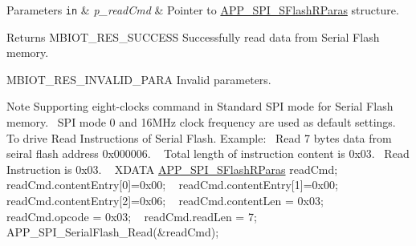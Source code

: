 \begin{DoxyParams}[1]{Parameters}
\mbox{\tt in}  & {\em p\+\_\+read\+Cmd} & Pointer to \hyperlink{struct_a_p_p___s_p_i___s_flash_r_paras}{A\+P\+P\+\_\+\+S\+P\+I\+\_\+\+S\+Flash\+R\+Paras} structure.\\
\hline
\end{DoxyParams}
\begin{DoxyReturn}{Returns}
M\+B\+I\+O\+T\+\_\+\+R\+E\+S\+\_\+\+S\+U\+C\+C\+E\+SS Successfully read data from Serial Flash memory. 

M\+B\+I\+O\+T\+\_\+\+R\+E\+S\+\_\+\+I\+N\+V\+A\+L\+I\+D\+\_\+\+P\+A\+RA Invalid parameters.
\end{DoxyReturn}
\begin{DoxyNote}{Note}
Supporting eight-\/clocks command in Standard S\+PI mode for Serial Flash memory.~\newline
 S\+PI mode 0 and 16\+M\+Hz clock frequency are used as default settings. ~\newline
 To drive Read Instructions of Serial Flash. Example\+:~\newline
 Read 7 bytes data from seiral flash address 0x000006. ~\newline
 Total length of instruction content is 0x03.~\newline
 Read Instruction is 0x03. ~\newline
 X\+D\+A\+TA \hyperlink{struct_a_p_p___s_p_i___s_flash_r_paras}{A\+P\+P\+\_\+\+S\+P\+I\+\_\+\+S\+Flash\+R\+Paras} read\+Cmd; ~\newline
 read\+Cmd.\+content\+Entry\mbox{[}0\mbox{]}=0x00; ~\newline
 read\+Cmd.\+content\+Entry\mbox{[}1\mbox{]}=0x00; ~\newline
 read\+Cmd.\+content\+Entry\mbox{[}2\mbox{]}=0x06; ~\newline
 read\+Cmd.\+content\+Len = 0x03; ~\newline
 read\+Cmd.\+opcode = 0x03; ~\newline
 read\+Cmd.\+read\+Len = 7; ~\newline
 A\+P\+P\+\_\+\+S\+P\+I\+\_\+\+Serial\+Flash\+\_\+\+Read(\&read\+Cmd); 
\end{DoxyNote}
